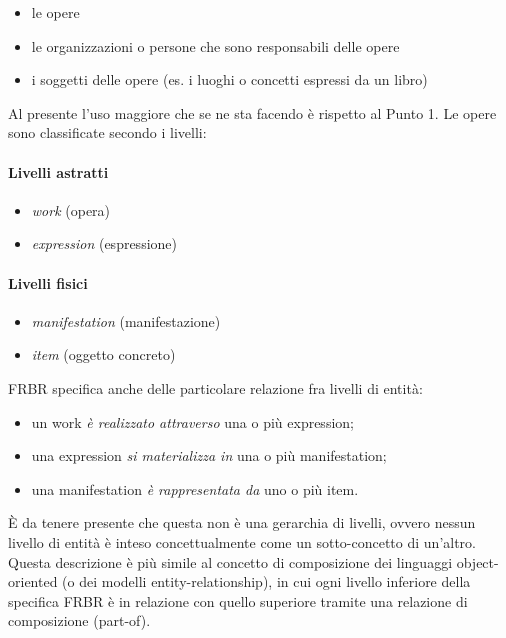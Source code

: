 \begin{itemize}
	\item le opere
	\item le organizzazioni o persone che sono responsabili delle opere
	\item i soggetti delle opere (es. i luoghi o concetti espressi da un libro)
\end{itemize}
\noindent
Al presente l'uso maggiore che se ne sta facendo è rispetto al Punto 1. Le opere sono classificate secondo i livelli:
\paragraph{Livelli astratti}
	\begin{itemize}
		\item \textit{work} (opera)
		\item \textit{expression} (espressione)
	\end{itemize}
\paragraph{Livelli fisici}
	\begin{itemize}
		\item \textit{manifestation} (manifestazione)
		\item \textit{item} (oggetto concreto)
	\end{itemize}
\newpage\noindent
FRBR specifica anche delle particolare relazione fra livelli di entità:
\begin{itemize}
	\item un work \textit{è realizzato attraverso} una o più expression;
	\item una expression \textit{si materializza in} una o più manifestation;
	\item una manifestation \textit{è rappresentata da} uno o più item.
\end{itemize}
\noindent
È da tenere presente che questa non è una gerarchia di livelli, ovvero nessun livello di entità è inteso concettualmente come un sotto-concetto di un'altro. 
Questa descrizione è più simile al concetto di composizione dei linguaggi object-oriented (o dei modelli entity-relationship), in cui ogni livello inferiore 
della specifica FRBR è in relazione con quello superiore tramite una relazione di composizione (part-of).


